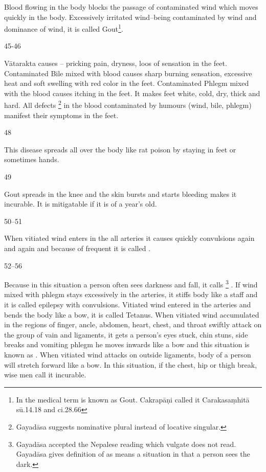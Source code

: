 \begin{translation}
	Blood flowing in the body blocks the passage of contaminated wind which
	moves quickly in the body. Excessively irritated wind--being
	contaminated by wind and dominance of wind, it is called 
	Gout\footnote{In the medical term  is known as Gout.
	Cakrapāṇi called it  Carakasaṃhitā sū.14.18 and ci.28.66}.

\item[45-46]

	Vātarakta causes -- pricking pain, dryness, loos of sensation in the
	feet. Contaminated Bile mixed with blood causes sharp burning sensation,
	excessive heat and soft swelling with red color in the feet.
	Contaminated Phlegm mixed with the blood causes itching in the feet. It
	makes feet white, cold, dry, thick and hard. All defects
	\footnote{Gayadāsa suggests  nominative plural
	instead of locative singular.} in the blood contaminated by humours
	(wind, bile, phlegm) manifest their symptoms in the feet.

\item[48]

	This disease spreads all over the body like rat poison by staying in
	feet or sometimes hands.

\item[49]

	Gout spreads in the knee and the skin bursts and starts bleeding makes
	it incurable. It is mitigatable if it is of a year’s old.

\item[50--51]

	When vitiated wind enters in the all arteries it causes quickly
	convulsions again and again and because of frequent
	 it is called .

\item[52--56]

	Because in this situation a person often sees darkness and fall, it
	calls  \footnote{Gayadāsa accepted
	the Nepalese reading  which vulgate does not read.  Gayadāsa
	gives definition of  as  means a situation in
	that a person sees the dark.} . If wind mixed with phlegm stays
	excessively in the arteries, it stiffs body like a staff and it is
	called  epilepsy with convulsions. Vitiated wind entered
	in the arteries and bends the body like a bow, it is called
	 Tetanus. When vitiated wind accumulated in the regions of
	finger, ancle, abdomen, heart, chest, and throat swiftly attack on the
	group of vain and ligaments, it gets a person’s eyes stuck, chin stuns,
	side breaks and vomiting phlegm he moves inwards like a bow and this
	situation is known as . When vitiated
	wind attacks on outside ligaments, body of a person will stretch forward
	like a bow. In this situation, if the chest, hip or thigh break, wise
	men call it incurable.


\end{translation}

